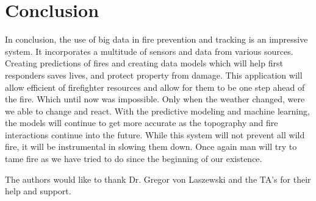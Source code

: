 \documentclass[sigconf]{acmart}
\begin{document}
\section{Conclusion}
In conclusion, the use of big data in fire prevention and tracking is an impressive system.  It incorporates a multitude of sensors and data from various sources.  Creating predictions of fires and creating data models which will help first responders saves lives, and protect property from damage.  This application will allow efficient of firefighter resources and allow for them to be one step ahead of the fire.  Which until now was impossible.  Only when the weather changed, were we able to change and react.   With the predictive modeling and machine learning, the models will continue to get more accurate as the topography and fire interactions continue into the future.  While this system will not prevent all wild fire, it will be instrumental in slowing them down.  Once again man will try to tame fire as we have tried to do since the beginning of our existence. 

\begin{acks}
The authors would like to thank Dr. Gregor von Laszewski and the TA's for their help and support.
\end{acks}


\end{document}
